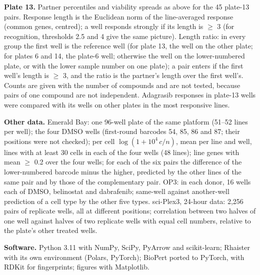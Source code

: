 \documentclass[pdflatex,sn-nature]{sn-jnl}
\begin{document}
\textbf{Plate 13.} Partner percentiles and viability spreads as above for the 45 plate-13 pairs. Response length is the Euclidean norm of the line-averaged response (common genes, centred); a well responds strongly if its length is $\geq$ 3 (for recognition, thresholds 2.5 and 4 give the same picture). Length ratio: in every group the first well is the reference well (for plate 13, the well on the other plate; for plates 6 and 14, the plate-6 well; otherwise the well on the lower-numbered plate, or with the lower sample number on one plate); a pair enters if the first well's length is $\geq$ 3, and the ratio is the partner's length over the first well's. Counts are given with the number of compounds and are not tested, because pairs of one compound are not independent. Adagrasib responses in plate-13 wells were compared with its wells on other plates in the most responsive lines.

\textbf{Other data.} Emerald Bay\cite{emeraldbay}: one 96-well plate of the same platform (51--52 lines per well); the four DMSO wells (first-round barcodes 54, 85, 86 and 87; their positions were not checked); per cell $\log(1+10^4\,c/n)$, mean per line and well, lines with at least 30 cells in each of the four wells (48 lines); line genes with mean $\geq$ 0.2 over the four wells; for each of the six pairs the difference of the lower-numbered barcode minus the higher, predicted by the other lines of the same pair and by those of the complementary pair. OP3\cite{szalata2024}: in each donor, 16 wells each of DMSO, belinostat and dabrafenib; same-well against another-well prediction of a cell type by the other five types. sci-Plex3\cite{srivatsan2020}, 24-hour data: 2,256 pairs of replicate wells, all at different positions; correlation between two halves of one well against halves of two replicate wells with equal cell numbers, relative to the plate's other treated wells.

\textbf{Software.} Python 3.11 with NumPy, SciPy, PyArrow and scikit-learn; Rhaister with its own environment (Polars, PyTorch); BioPert ported to PyTorch, with RDKit for fingerprints; figures with Matplotlib.
\end{document}
